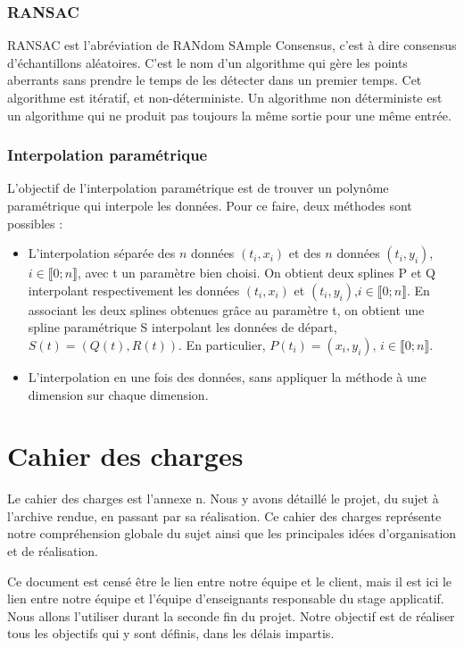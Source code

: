 \documentclass[a4paper,10pt]{article} %
\begin{document}
\subsubsection*{RANSAC}

RANSAC est l'abréviation de RANdom SAmple Consensus, c'est à dire consensus d'échantillons aléatoires. C'est le nom d'un algorithme qui gère les points aberrants sans prendre le temps de les détecter dans un premier temps. Cet algorithme est itératif, et non-déterministe. Un algorithme non déterministe est un algorithme qui ne produit pas toujours la même sortie pour une même entrée.

\subsubsection*{Interpolation paramétrique}

L'objectif de l'interpolation paramétrique est de trouver un polynôme paramétrique qui interpole les données. Pour ce faire, deux méthodes sont possibles :
\begin{itemize}
\item L'interpolation séparée des $n$ données $(t_i,x_i)$ et des $n$ données $(t_i,y_i)$, $i\in\llbracket 0; n \rrbracket$, avec t un paramètre bien choisi. On obtient deux splines P et Q interpolant respectivement les données $(t_i,x_i)$ et $(t_i,y_i)$,$i\in\llbracket 0; n \rrbracket$. En associant les deux splines obtenues grâce au paramètre t, on obtient une spline paramétrique S interpolant les données de départ, $S(t) = (Q(t),R(t))$. En particulier, $P(t_i) = (x_i,y_i)$, $i\in\llbracket 0; n \rrbracket$.
\item L'interpolation en une fois des données, sans appliquer la méthode à une dimension sur chaque dimension.
\end{itemize}


\section{Cahier des charges}

Le cahier des charges est l'annexe n. Nous y avons détaillé le projet, du sujet à l'archive rendue, en passant par sa réalisation. Ce cahier des charges représente notre compréhension globale du sujet ainsi que les principales idées d'organisation et de réalisation.

Ce document est censé être le lien entre notre équipe et le client, mais il est ici le lien entre notre équipe et l'équipe d'enseignants responsable du stage applicatif. Nous allons l'utiliser durant la seconde fin du projet. Notre objectif est de réaliser tous les objectifs qui y sont définis, dans les délais impartis.
\end{document}
